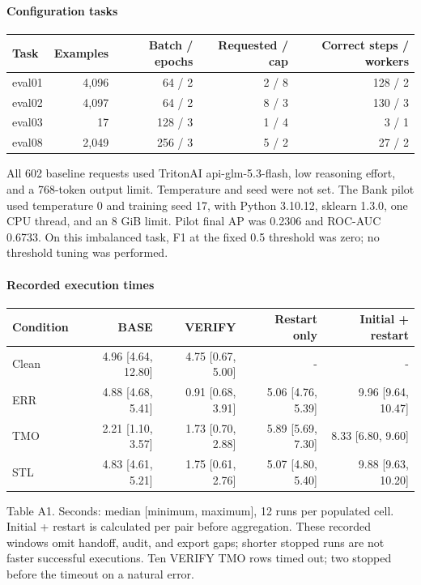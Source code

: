 \documentclass{article}
\renewcommand{\footnotesize}{\fontsize{9}{10}\selectfont}
\begin{document}
\paragraph{Configuration tasks}
\begin{center}
\footnotesize
\setlength{\tabcolsep}{4pt}
\renewcommand{\arraystretch}{1.12}
\begin{tabular}{@{}lrrrr@{}}
\toprule
\textbf{Task} & \textbf{Examples} & \textbf{Batch / epochs} & \textbf{Requested / cap} & \textbf{Correct steps / workers} \\
\midrule
eval01 & 4,096 & 64 / 2 & 2 / 8 & 128 / 2 \\
eval02 & 4,097 & 64 / 2 & 8 / 3 & 130 / 3 \\
eval03 & 17 & 128 / 3 & 1 / 4 & 3 / 1 \\
eval08 & 2,049 & 256 / 3 & 5 / 2 & 27 / 2 \\
\bottomrule
\end{tabular}
\end{center}
All 602 baseline requests used TritonAI api-glm-5.3-flash, low reasoning effort, and a 768-token output limit. Temperature and seed were not set. The Bank pilot used temperature 0 and training seed 17, with Python 3.10.12, sklearn 1.3.0, one CPU thread, and an 8 GiB limit. Pilot final AP was 0.2306 and ROC-AUC 0.6733. On this imbalanced task, F1 at the fixed 0.5 threshold was zero; no threshold tuning was performed.

\paragraph{Recorded execution times}
\begin{center}
\footnotesize
\setlength{\tabcolsep}{4pt}
\renewcommand{\arraystretch}{1.12}
\begin{tabular}{@{}lrrrr@{}}
\toprule
\textbf{Condition} & \textbf{BASE} & \textbf{VERIFY} & \textbf{Restart only} & \textbf{Initial + restart} \\
\midrule
Clean & 4.96 [4.64, 12.80] & 4.75 [0.67, 5.00] & - & - \\
ERR & 4.88 [4.68, 5.41] & 0.91 [0.68, 3.91] & 5.06 [4.76, 5.39] & 9.96 [9.64, 10.47] \\
TMO & 2.21 [1.10, 3.57] & 1.73 [0.70, 2.88] & 5.89 [5.69, 7.30] & 8.33 [6.80, 9.60] \\
STL & 4.83 [4.61, 5.21] & 1.75 [0.61, 2.76] & 5.07 [4.80, 5.40] & 9.88 [9.63, 10.20] \\
\bottomrule
\end{tabular}
\end{center}
{\footnotesize Table A1. Seconds: median [minimum, maximum], 12 runs per populated cell. Initial + restart is calculated per pair before aggregation. These recorded windows omit handoff, audit, and export gaps; shorter stopped runs are not faster successful executions. Ten VERIFY TMO rows timed out; two stopped before the timeout on a natural error.\par}

\endgroup
\end{document}
